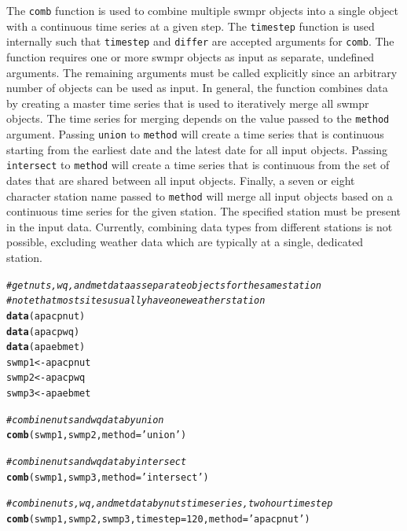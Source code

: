 \documentclass[10pt,letterpaper]{article}\usepackage[]{graphicx}\usepackage[]{color}
\makeatletter
\newcommand{\hlnum}[1]{\textcolor[rgb]{0.686,0.059,0.569}{#1}}%
\newcommand{\hlstr}[1]{\textcolor[rgb]{0.192,0.494,0.8}{#1}}%
\newcommand{\hlcom}[1]{\textcolor[rgb]{0.678,0.584,0.686}{\textit{#1}}}%
\newcommand{\hlstd}[1]{\textcolor[rgb]{0.345,0.345,0.345}{#1}}%
\newcommand{\hlkwb}[1]{\textcolor[rgb]{0.69,0.353,0.396}{#1}}%
\newcommand{\hlkwc}[1]{\textcolor[rgb]{0.333,0.667,0.333}{#1}}%
\newcommand{\hlkwd}[1]{\textcolor[rgb]{0.737,0.353,0.396}{\textbf{#1}}}%
\newenvironment{kframe}{%
 \def\at@end@of@kframe{}%
 \ifinner\ifhmode%
  \def\at@end@of@kframe{\end{minipage}}%
  \begin{minipage}{\columnwidth}%
 \fi\fi%
 \def\FrameCommand##1{\hskip\@totalleftmargin \hskip-\fboxsep
 \colorbox{shadecolor}{##1}\hskip-\fboxsep
     \hskip-\linewidth \hskip-\@totalleftmargin \hskip\columnwidth}%
 \MakeFramed {\advance\hsize-\width
   \@totalleftmargin\z@ \linewidth\hsize
   \@setminipage}}%
 {\par\unskip\endMakeFramed%
 \at@end@of@kframe}
\newenvironment{knitrout}{}{} %
\makeatother
\begin{document}
The \texttt{comb} function is used to combine multiple swmpr objects into a single object with a continuous time series at a given step.  The \texttt{timestep} function is used internally such that \texttt{timestep} and \texttt{differ} are accepted arguments for \texttt{comb}.  The function requires one or more swmpr objects as input as separate, undefined arguments.  The remaining arguments must be called explicitly since an arbitrary number of objects can be used as input.  In general, the function combines data by creating a master time series that is used to iteratively merge all swmpr objects.  The time series for merging depends on the value passed to the \texttt{method} argument.  Passing \texttt{union} to \texttt{method} will create a time series that is continuous starting from the earliest date and the latest date for all input objects.  Passing \texttt{intersect} to \texttt{method} will create a time series that is continuous from the set of dates that are shared between all input objects.  Finally, a seven or eight character station name passed to \texttt{method} will merge all input objects based on a continuous time series for the given station.  The specified station must be present in the input data.  Currently, combining data types from different stations is not possible, excluding weather data which are typically at a single, dedicated station.  

\begin{knitrout}
\color{fgcolor}\begin{kframe}
\begin{alltt}
\hlcom{# get nuts, wq, and met data as separate objects for the same station}
\hlcom{# note that most sites usually have one weather station}
\hlkwd{data}\hlstd{(apacpnut)}
\hlkwd{data}\hlstd{(apacpwq)}
\hlkwd{data}\hlstd{(apaebmet)}
\hlstd{swmp1} \hlkwb{<-} \hlstd{apacpnut}
\hlstd{swmp2} \hlkwb{<-} \hlstd{apacpwq}
\hlstd{swmp3} \hlkwb{<-} \hlstd{apaebmet}

\hlcom{# combine nuts and wq data by union}
\hlkwd{comb}\hlstd{(swmp1, swmp2,} \hlkwc{method} \hlstd{=} \hlstr{'union'}\hlstd{)}

\hlcom{# combine nuts and wq data by intersect}
\hlkwd{comb}\hlstd{(swmp1, swmp3,} \hlkwc{method} \hlstd{=} \hlstr{'intersect'}\hlstd{)}

\hlcom{# combine nuts, wq, and met data by nuts time series, two hour time step}
\hlkwd{comb}\hlstd{(swmp1, swmp2, swmp3,} \hlkwc{timestep} \hlstd{=} \hlnum{120}\hlstd{,} \hlkwc{method} \hlstd{=} \hlstr{'apacpnut'}\hlstd{)}
\end{alltt}
\end{kframe}
\end{knitrout}
\end{document}
